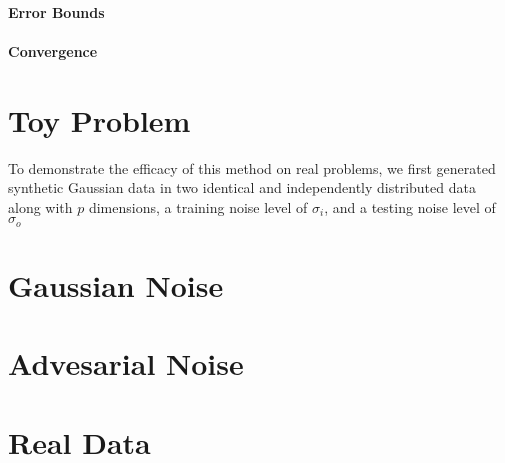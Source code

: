 \documentclass[conference]{IEEEtran}
\begin{document}
\paragraph{Error Bounds}

\paragraph{Convergence}

\section{Toy Problem}
To demonstrate the efficacy of this method on real problems, we first generated synthetic Gaussian data in two identical and independently distributed data along with $p$ dimensions, a training noise level of $\sigma_i$, and a testing noise level of $\sigma_o$
\section{Gaussian Noise}
\section{Advesarial Noise}
\section{Real Data}



\end{document}
